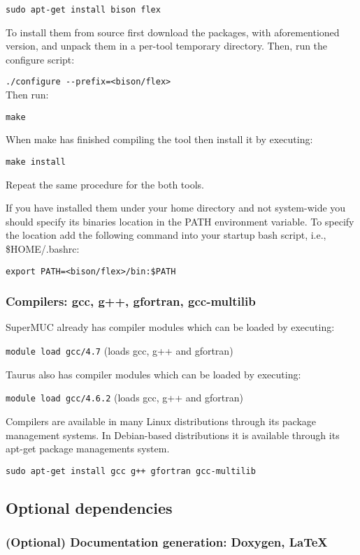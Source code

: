 \texttt{sudo apt-get install bison flex}

To install them from source first download the packages, with aforementioned
version, and unpack them in a per-tool temporary directory. Then, run the
configure script:

\texttt{./configure -{}-prefix=\installloc <bison/flex>} \\

Then run:

\texttt{make}

When make has finished compiling the tool then install it by executing:

\texttt{make install}

Repeat the same procedure for the both tools.

If you have installed them under your home directory and not system-wide you
should specify its binaries location in the PATH environment variable. To
specify the location add the following command into your startup bash script,
i.e., \$HOME/.bashrc:

\texttt{export PATH=\installloc <bison/flex>/bin:\$PATH}


\subsubsection{Compilers: gcc, g++, gfortran, gcc-multilib}
SuperMUC already has compiler modules which can be loaded by executing:

\texttt{module load gcc/4.7}  (loads gcc, g++ and gfortran)

Taurus also has compiler modules which can be loaded by executing:

\texttt{module load gcc/4.6.2} (loads gcc, g++ and gfortran)

Compilers are available in many Linux distributions through its package management systems.
In Debian-based distributions it is available through its apt-get package managements system.

\texttt{sudo apt-get install gcc g++ gfortran gcc-multilib}

\subsection{Optional dependencies}

\subsubsection{(Optional) Documentation generation: Doxygen, LaTeX}

